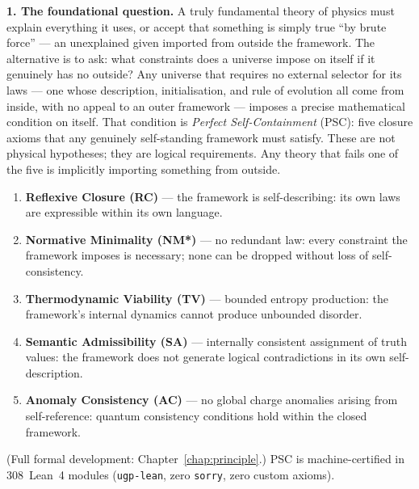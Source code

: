 \documentclass[11pt,openany]{book}
\theoremstyle{remark}
\begin{document}
\medskip

\textbf{1. The foundational question.}
A truly fundamental theory of physics must explain everything it uses, or accept that
something is simply true ``by brute force'' --- an unexplained given imported
from outside the framework.
The alternative is to ask: what constraints does a universe impose on itself
if it genuinely has no outside?
Any universe that requires no external selector for its laws --- one whose
description, initialisation, and rule of evolution all come from inside, with
no appeal to an outer framework --- imposes a precise mathematical condition
on itself.
That condition is \emph{Perfect Self-Containment} (PSC): five closure axioms
that any genuinely self-standing framework must satisfy.
These are not physical hypotheses; they are logical requirements.
Any theory that fails one of the five is implicitly importing something from outside.

\begin{tcolorbox}[colback=blue!3,colframe=blue!40!black,
  title={\textbf{The Five PSC Closure Axioms}},
  fonttitle=\small\bfseries, left=6pt, right=6pt, top=4pt, bottom=4pt]
\small
\begin{enumerate}[label=\textbf{\Roman*.},itemsep=2pt,topsep=2pt,leftmargin=2.2em]
\item \textbf{Reflexive Closure (RC)} — the framework is self-describing: its own
  laws are expressible within its own language.
\item \textbf{Normative Minimality (NM*)} — no redundant law: every constraint
  the framework imposes is necessary; none can be dropped without loss of
  self-consistency.
\item \textbf{Thermodynamic Viability (TV)} — bounded entropy production: the
  framework's internal dynamics cannot produce unbounded disorder.
\item \textbf{Semantic Admissibility (SA)} — internally consistent assignment of
  truth values: the framework does not generate logical contradictions in
  its own self-description.
\item \textbf{Anomaly Consistency (AC)} — no global charge anomalies arising from
  self-reference: quantum consistency conditions hold within the closed framework.
\end{enumerate}
\end{tcolorbox}

(Full formal development: Chapter~\ref{chap:principle}.)
PSC is machine-certified in 308~Lean~4 modules (\texttt{ugp-lean}, zero
\texttt{sorry}, zero custom axioms).
\end{document}
